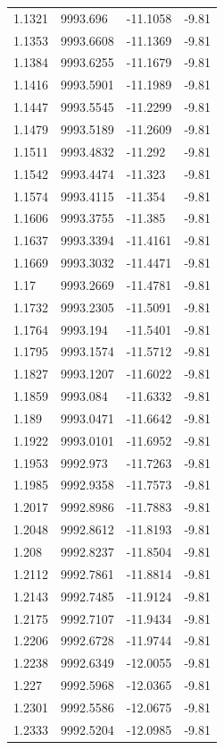 \begin{table}[H]
\begin{tabular}{llll}
1.1321 & 9993.696 & -11.1058 & -9.81 \\
1.1353 & 9993.6608 & -11.1369 & -9.81 \\
1.1384 & 9993.6255 & -11.1679 & -9.81 \\
1.1416 & 9993.5901 & -11.1989 & -9.81 \\
1.1447 & 9993.5545 & -11.2299 & -9.81 \\
1.1479 & 9993.5189 & -11.2609 & -9.81 \\
1.1511 & 9993.4832 & -11.292 & -9.81 \\
1.1542 & 9993.4474 & -11.323 & -9.81 \\
1.1574 & 9993.4115 & -11.354 & -9.81 \\
1.1606 & 9993.3755 & -11.385 & -9.81 \\
1.1637 & 9993.3394 & -11.4161 & -9.81 \\
1.1669 & 9993.3032 & -11.4471 & -9.81 \\
1.17 & 9993.2669 & -11.4781 & -9.81 \\
1.1732 & 9993.2305 & -11.5091 & -9.81 \\
1.1764 & 9993.194 & -11.5401 & -9.81 \\
1.1795 & 9993.1574 & -11.5712 & -9.81 \\
1.1827 & 9993.1207 & -11.6022 & -9.81 \\
1.1859 & 9993.084 & -11.6332 & -9.81 \\
1.189 & 9993.0471 & -11.6642 & -9.81 \\
1.1922 & 9993.0101 & -11.6952 & -9.81 \\
1.1953 & 9992.973 & -11.7263 & -9.81 \\
1.1985 & 9992.9358 & -11.7573 & -9.81 \\
1.2017 & 9992.8986 & -11.7883 & -9.81 \\
1.2048 & 9992.8612 & -11.8193 & -9.81 \\
1.208 & 9992.8237 & -11.8504 & -9.81 \\
1.2112 & 9992.7861 & -11.8814 & -9.81 \\
1.2143 & 9992.7485 & -11.9124 & -9.81 \\
1.2175 & 9992.7107 & -11.9434 & -9.81 \\
1.2206 & 9992.6728 & -11.9744 & -9.81 \\
1.2238 & 9992.6349 & -12.0055 & -9.81 \\
1.227 & 9992.5968 & -12.0365 & -9.81 \\
1.2301 & 9992.5586 & -12.0675 & -9.81 \\
1.2333 & 9992.5204 & -12.0985 & -9.81 \\

\end{tabular}
\end{table}
